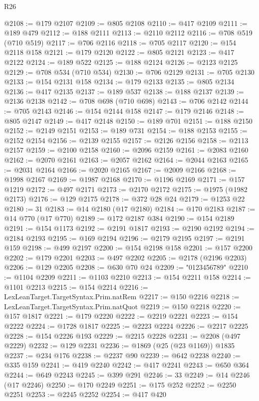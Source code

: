 \begin{lexlean}{R26}
\begin{coremodule}
@2108 := @179 @2107
@2109 := @805 @2108
@2110 := @417 @2109
@2111 := @189 @479
@2112 := @188 @2111
@2113 := @2110 @2112
@2116 := @708 @519 (@710 @519)
@2117 := @706 @2116
@2118 := @705 @2117
@2120 := @154 @2118 @158
@2121 := @179 @2120
@2122 := @805 @2121
@2123 := @417 @2122
@2124 := @189 @522
@2125 := @188 @2124
@2126 := @2123 @2125
@2129 := @708 @534 (@710 @534)
@2130 := @706 @2129
@2131 := @705 @2130
@2133 := @154 @2131 @158
@2134 := @179 @2133
@2135 := @805 @2134
@2136 := @417 @2135
@2137 := @189 @537
@2138 := @188 @2137
@2139 := @2136 @2138
@2142 := @708 @698 (@710 @698)
@2143 := @706 @2142
@2144 := @705 @2143
@2146 := @154 @2144 @158
@2147 := @179 @2146
@2148 := @805 @2147
@2149 := @417 @2148
@2150 := @189 @701
@2151 := @188 @2150
@2152 := @2149 @2151
@2153 := @189 @731
@2154 := @188 @2153
@2155 := @2152 @2154
@2156 := @2139 @2155
@2157 := @2126 @2156
@2158 := @2113 @2157
@2159 := @2100 @2158
@2160 := @2096 @2159
@2161 := @2083 @2160
@2162 := @2070 @2161
@2163 := @2057 @2162
@2164 := @2044 @2163
@2165 := @2031 @2164
@2166 := @2020 @2165
@2167 := @2009 @2166
@2168 := @1998 @2167
@2169 := @1987 @2168
@2170 := @1196 @2169
@2171 := @157 @1219
@2172 := @497 @2171
@2173 := @2170 @2172
@2175 := @1975 (@1982 @2173)
@2176 := @129 @2175
@2178 := @372 @28 @24
@2179 := @1253 @22
@2180 := 31
@2183 := @14 @2180 (@17 @2180)
@2184 := @170 @2183
@2187 := @14 @770 (@17 @770)
@2189 := @172 @2187 @384
@2190 := @154 @2189
@2191 := @154 @1173
@2192 := @2191 @1817
@2193 := @2190 @2192
@2194 := @2184 @2193
@2195 := @169 @2194
@2196 := @2179 @2195
@2197 := @2191 @159
@2198 := @499 @2197
@2200 := @154 @2198 @158
@2201 := @157 @2200
@2202 := @179 @2201
@2203 := @497 @2202
@2205 := @2178 (@2196 @2203)
@2206 := @129 @2205
@2208 := @630 @70 @24
@2209 := "0123456789"
@2210 := @1104 @2209
@2211 := @1103 @2210
@2213 := @154 @2211 @158
@2214 := @1101 @2213
@2215 := @154 @2214
@2216 := LexLeanTarget.TargetSyntax.Prim.natRem
@2217 := @150 @2216
@2218 := LexLeanTarget.TargetSyntax.Prim.natQuot
@2219 := @150 @2218
@2220 := @157 @1817
@2221 := @179 @2220
@2222 := @2219 @2221
@2223 := @154 @2222
@2224 := @1728 @1817
@2225 := @2223 @2224
@2226 := @2217 @2225
@2228 := @154 @2226 @193
@2229 := @2215 @2228
@2231 := @2208 (@497 @2229)
@2232 := @129 @2231
@2236 := @1869 (@25 (@23 @1169)) @1835
@2237 := @234 @176
@2238 := @2237 @90
@2239 := @642 @2238
@2240 := @335 @159
@2241 := @419 @2240
@2242 := @417 @2241
@2243 := @650 @364
@2244 := @649 @2243
@2245 := @399 @291
@2246 := 33
@2249 := @14 @2246 (@17 @2246)
@2250 := @170 @2249
@2251 := @175 @252
@2252 := @2250 @2251
@2253 := @2245 @2252
@2254 := @417 @420

\end{coremodule}
\end{lexlean}
